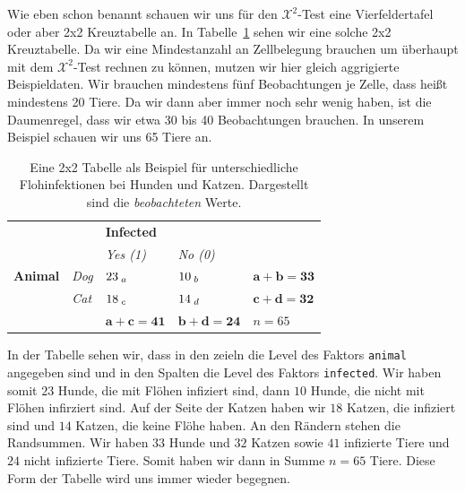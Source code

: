\documentclass[
  letterpaper,
]{scrbook}
\begin{document}
Wie eben schon benannt schauen wir uns für den \(\mathcal{X}^2\)-Test
eine Vierfeldertafel oder aber 2x2 Kreuztabelle an. In
Tabelle~\ref{tbl-chi-square-obs} sehen wir eine solche 2x2 Kreuztabelle.
Da wir eine Mindestanzahl an Zellbelegung brauchen um überhaupt mit dem
\(\mathcal{X}^2\)-Test rechnen zu können, mutzen wir hier gleich
aggrigierte Beispieldaten. Wir brauchen mindestens fünf Beobachtungen je
Zelle, dass heißt mindestens 20 Tiere. Da wir dann aber immer noch sehr
wenig haben, ist die Daumenregel, dass wir etwa 30 bis 40 Beobachtungen
brauchen. In unserem Beispiel schauen wir uns 65 Tiere an.

\hypertarget{tbl-chi-square-obs}{}
\begin{longtable}[]{@{}
  >{\centering\arraybackslash}p{}
  >{\centering\arraybackslash}p{}
  >{\centering\arraybackslash}p{}
  >{\centering\arraybackslash}p{}
  >{\centering\arraybackslash}p{}@{}}
\caption{\label{tbl-chi-square-obs}Eine 2x2 Tabelle als Beispiel für
unterschiedliche Flohinfektionen bei Hunden und Katzen. Dargestellt sind
die \emph{beobachteten} Werte.}\tabularnewline
\toprule()
\endhead
& & \textbf{Infected} & & \\
& & \emph{Yes (1)} & \emph{No (0)} & \\
\textbf{Animal} & \emph{Dog} & \(23_{\;\Large a}\) & \(10_{\;\Large b}\)
& \(\mathbf{a+b = 33}\) \\
& \emph{Cat} & \(18_{\;\Large c}\) & \(14_{\;\Large d}\) &
\(\mathbf{c+d = 32}\) \\
& & \(\mathbf{a+c = 41}\) & \(\mathbf{b+d = 24}\) & \(n = 65\) \\
\bottomrule()
\end{longtable}

In der Tabelle sehen wir, dass in den zeieln die Level des Faktors
\texttt{animal} angegeben sind und in den Spalten die Level des Faktors
\texttt{infected}. Wir haben somit \(23\) Hunde, die mit Flöhen
infiziert sind, dann \(10\) Hunde, die nicht mit Flöhen infirziert sind.
Auf der Seite der Katzen haben wir \(18\) Katzen, die infiziert sind und
\(14\) Katzen, die keine Flöhe haben. An den Rändern stehen die
Randsummen. Wir haben \(33\) Hunde und \(32\) Katzen sowie \(41\)
infizierte Tiere und \(24\) nicht infizierte Tiere. Somit haben wir dann
in Summe \(n = 65\) Tiere. Diese Form der Tabelle wird uns immer wieder
begegnen.
\end{document}
